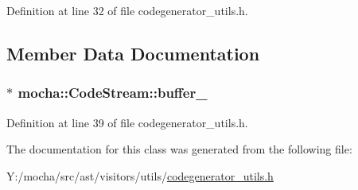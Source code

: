 Definition at line 32 of file codegenerator\_\-utils.h.



\subsection{Member Data Documentation}
\hypertarget{classmocha_1_1_code_stream_a36360ceeeeef7085eb47ae18175ec1f4}{
\subsubsection[{buffer\_\-}]{$\ast$ {\bf mocha::CodeStream::buffer\_\-}}}
\label{classmocha_1_1_code_stream_a36360ceeeeef7085eb47ae18175ec1f4}


Definition at line 39 of file codegenerator\_\-utils.h.



The documentation for this class was generated from the following file:\begin{DoxyCompactItemize}
\item 
Y:/mocha/src/ast/visitors/utils/\hyperlink{codegenerator__utils_8h}{codegenerator\_\-utils.h}\end{DoxyCompactItemize}
